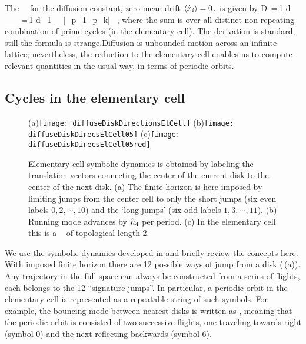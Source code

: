 The \dzeta\ \cycForm\ for the diffusion constant, zero mean drift
$ \left\langle { \hat{x}_i } \right\rangle = 0 \,, $ is given by
 \beq D \,=\,{1  d}
{ _\zeta \over \expct{\period{}}_\zeta } \,=\,{1
   d } \, {1 \over \expct{\period{}}_\zeta} \sumprime
{}
{|\ExpaEig_{p_1}\cdots \ExpaEig_{p_k}|} \, ,
\label{eq-ecDiffCoef}
\eeq
where the sum is over all distinct non-repeating combination of prime
cycles (in the elementary cell). The derivation is standard, still the
formula is strange.Diffusion is unbounded motion across an infinite
lattice; nevertheless, the reduction to the elementary cell enables us to
compute relevant quantities in the usual way, in terms of periodic
orbits.

\subsection{Cycles in the elementary cell}
\begin{figure}
  \begin{center}
    (a)\texttt{[image: diffuseDiskDirectionsElCell]}
    (b)\texttt{[image: diffuseDiskDirecsElCell05]}
    (c)\texttt{[image: diffuseDiskDirecsElCell05red]}
  \end{center}
  \caption{\label{fig-diskDirectionsElCell}
  Elementary cell symbolic dynamics is obtained by labeling the
  translation vectors connecting the center of the current disk to the
  center of  the next disk. (a) The finite horizon is here imposed by
  limiting jumps from  the center cell to only the short jumps (six even
  labels $0, 2,\cdots,10$) and  the `long jumps' (six odd labels $1,
  3,\cdots,11$). (b) Running mode   advances by $\hat n_4$ per
  period. (c) In the elementary cell this is  a \po\  of
  topological length 2.
  }
\end{figure}

We use the symbolic dynamics developed in  and briefly
review the concepts here. With imposed finite horizon there are 12
possible ways of jump from a disk
(\,(a)). Any trajectory in the full
space can always be constructed from a series of flights, each belongs to
the 12 ``signature jumps''. In particular, a periodic orbit in the
elementary cell is represented as a repeatable string of such symbols.
For example, the bouncing mode between nearest disks is written as
, meaning that the periodic orbit is consisted of two
successive flights, one traveling towards right (symbol $0$) and the next
reflecting backwards (symbol $6$).


